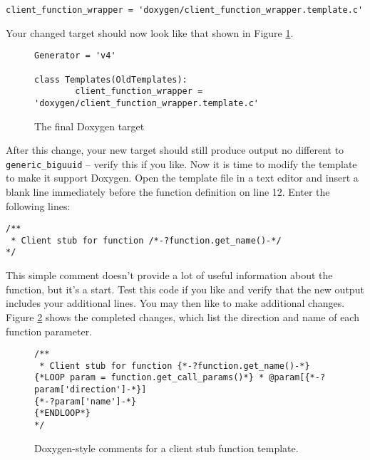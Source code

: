 \begin{verbatim}
client_function_wrapper = 'doxygen/client_function_wrapper.template.c'
\end{verbatim}

Your changed target should now look like that shown in Figure \ref{fig:tut:target:doxygen}. 
\begin{figure}
\begin{verbatim}
Generator = 'v4'

class Templates(OldTemplates):
        client_function_wrapper = 'doxygen/client_function_wrapper.template.c'
\end{verbatim}
\caption{The final Doxygen target}
\label{fig:tut:target:doxygen}
\end{figure}

After this change, your new target should still produce output no different to {\tt generic\_biguuid} -- verify this if you like. Now it is time to modify the template to make it support Doxygen. Open the template file in a text editor and insert a blank line immediately before the function definition on line 12. Enter the following lines:

\begin{verbatim}
/**
 * Client stub for function /*-?function.get_name()-*/
*/
\end{verbatim}

This simple comment doesn't provide a lot of useful information about the function, but it's a start. Test this code if you like and verify that the new output includes your additional lines. You may then like to make additional changes. Figure \ref{fig.templating.tutorial.doxygen.function} shows the completed changes, which list the direction and name of each function parameter.
\begin{figure}
\begin{verbatim}
/**
 * Client stub for function {*-?function.get_name()-*}
{*LOOP param = function.get_call_params()*} * @param[{*-?param['direction']-*}]
{*-?param['name']-*} 
{*ENDLOOP*}
*/
\end{verbatim}
\caption{Doxygen-style comments for a client stub function template.}
\label{fig.templating.tutorial.doxygen.function}
\end{figure}

